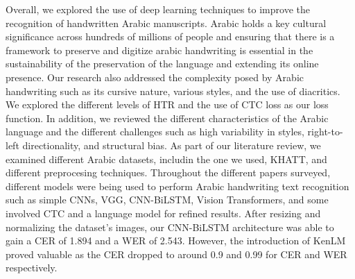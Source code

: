 \documentclass[conference]{IEEEtran}
\begin{document}
Overall, we explored the use of deep learning techniques to improve the recognition of handwritten Arabic manuscripts. Arabic holds a key cultural significance across hundreds of millions of people and ensuring that there is a framework to preserve and digitize arabic handwriting is essential in the sustainability of the preservation of the language and extending its online presence. Our research also addressed the complexity posed by Arabic handwriting such as its cursive nature, various styles, and the use of diacritics. We explored the different levels of HTR and the use of CTC loss as our loss function. In addition, we reviewed the different characteristics of the Arabic language and the different challenges such as high variability in styles, right-to-left directionality, and structural bias. As part of our literature review, we examined different Arabic datasets, includin the one we used, KHATT, and different preprocesing techniques. Throughout the different papers surveyed, different models were being used to perform Arabic handwriting text recognition such as simple CNNs, VGG, CNN-BiLSTM, Vision Transformers, and some involved CTC and a language model for refined results. After resizing and normalizing the dataset's images, our CNN-BiLSTM architecture was able to gain a CER of 1.894 and a WER of 2.543. However, the introduction of KenLM proved valuable as the CER dropped to around 0.9 and 0.99 for CER and WER respectively. 





 

\end{document}
